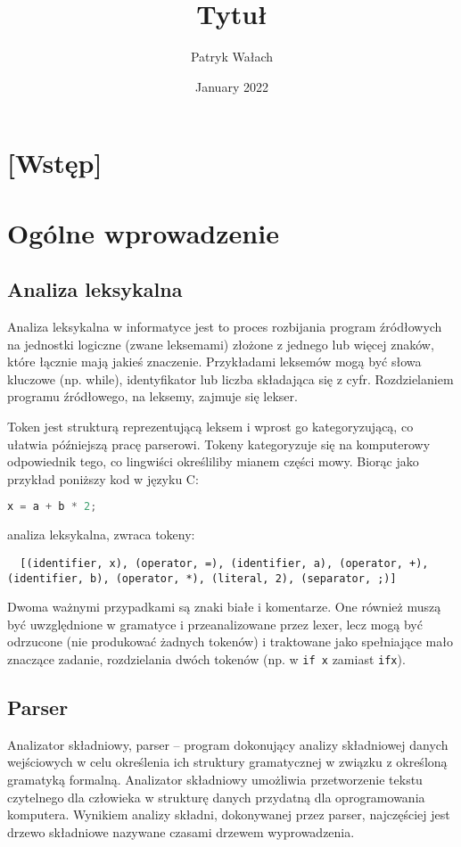 \documentclass{article}
\title{Tytuł}
\author{Patryk Wałach}
\date{January 2022}
\begin{document}
\maketitle
\tableofcontents

\section{[Wstęp]}

\section{Ogólne wprowadzenie}
\subsection{Analiza leksykalna}
Analiza leksykalna w informatyce jest to proces rozbijania program źródłowych na jednostki logiczne (zwane leksemami) złożone z jednego lub więcej znaków, które łącznie mają jakieś znaczenie\cite{Hopcroft__Motwani__Ullman__2005}. Przykładami leksemów mogą być słowa kluczowe (np. while), identyfikator lub liczba składająca się z cyfr. Rozdzielaniem programu źródłowego, na leksemy, zajmuje się lekser.

Token jest strukturą reprezentującą leksem i wprost go kategoryzującą\cite{ Aho__Sethi__Ullman__1985}, co ułatwia późniejszą pracę parserowi. Tokeny kategoryzuje się na komputerowy odpowiednik tego, co lingwiści określiliby mianem części mowy. Biorąc jako przykład poniższy kod w języku C:
\begin{lstlisting}[language=c]
  x = a + b * 2;
\end{lstlisting}
analiza leksykalna, zwraca tokeny:
\begin{lstlisting}
  [(identifier, x), (operator, =), (identifier, a), (operator, +), (identifier, b), (operator, *), (literal, 2), (separator, ;)]
\end{lstlisting}
Dwoma ważnymi przypadkami są znaki białe i komentarze. One również muszą być uwzględnione w gramatyce i przeanalizowane przez lexer, lecz mogą być odrzucone (nie produkować żadnych tokenów) i traktowane jako spełniające mało znaczące zadanie, rozdzielania dwóch tokenów (np. w \lstinline{if x} zamiast \lstinline{ifx}).

\subsection{Parser}
Analizator składniowy, parser – program dokonujący analizy składniowej danych wejściowych w celu określenia ich struktury gramatycznej w związku z określoną gramatyką formalną. Analizator składniowy umożliwia przetworzenie tekstu czytelnego dla człowieka w strukturę danych przydatną dla oprogramowania komputera. Wynikiem analizy składni, dokonywanej przez parser, najczęściej jest drzewo składniowe nazywane czasami drzewem wyprowadzenia\cite{Aho__Sethi__Ullman__1985}.
\end{document}
